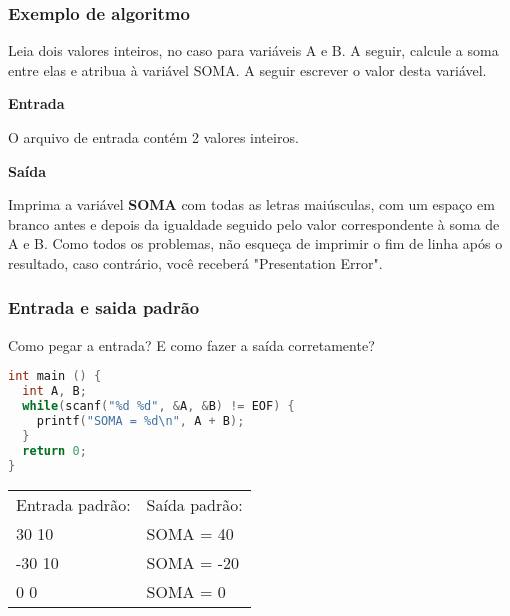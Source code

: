\begin{frame}
  \frametitle{Exemplo de algoritmo}
    Leia dois valores inteiros, no caso para variáveis A e B. A seguir, calcule a soma entre elas e atribua à variável SOMA. A seguir escrever o valor desta variável.

  \begin{center}
    \textbf{Entrada}
  \end{center}
  O arquivo de entrada contém 2 valores inteiros.
  
  \begin{center}
    \textbf{Saída}
  \end{center}
  Imprima a variável \textbf{SOMA} com todas as letras maiúsculas, com um espaço em branco antes e depois da igualdade seguido pelo valor correspondente à soma de A e B. Como todos os problemas, não esqueça de imprimir o fim de linha após o resultado, caso contrário, você receberá "Presentation Error".
\end{frame}

\begin{frame}[fragile]
  \frametitle{Entrada e saida padrão}
  Como pegar a entrada? E como fazer a saída corretamente?
  \begin{lstlisting}[language=c]
int main () {
  int A, B;
  while(scanf("%d %d", &A, &B) != EOF) {
    printf("SOMA = %d\n", A + B);
  }
  return 0;
}
  \end{lstlisting}
  \begin{tabular}{ll}\\
    Entrada padrão: &Saída padrão:\\
    30 10 &SOMA = 40\\
    -30 10 &SOMA = -20\\
    0 0 &SOMA = 0\\
  \end{tabular}
\end{frame}

